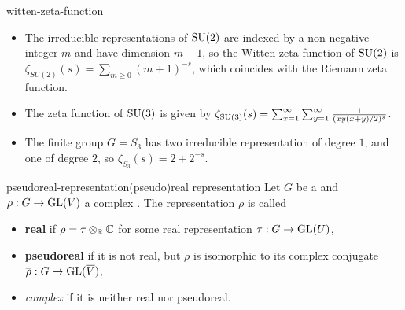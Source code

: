 \begin{example}{witten-zeta-function}
    \begin{itemize}
        \item The irreducible representations of $\textup{SU}(2)$ are indexed by a non-negative integer $m$ and have dimension $m + 1$, so the Witten zeta function of $\textup{SU}(2)$ is $\zeta_{SU(2)}(s) = \sum_{m \ge 0} (m + 1)^{-s}$, which coincides with the Riemann zeta function.
        \item The zeta function of $\textup{SU}(3)$ is given by $\zeta_{\textup{SU}(3)}(s) = \sum_{x = 1}^{\infty} \sum_{y = 1}^{\infty} \frac{1}{(xy(x + y) / 2)^s}$.
        \item The finite group $G = S_3$ has two irreducible representation of degree $1$, and one of degree $2$, so $\zeta_{S_3}(s) = 2 + 2^{-s}$.
    \end{itemize}
\end{example}

\begin{topic}{pseudoreal-representation}{(pseudo)real representation}
    Let $G$ be a  and $\rho : G \to \textup{GL}(V)$ a complex . The representation $\rho$ is called
    \begin{itemize}
        \item \textbf{real} if $\rho = \tau \otimes_{\mathbb{R}} \mathbb{C}$ for some real representation $\tau : G \to \textup{GL}(U)$,
        \item \textbf{pseudoreal} if it is not real, but $\rho$ is isomorphic to its complex conjugate $\overline{\rho} : G \to \textup{GL}(\overline{V})$,
        \item \textit{complex} if it is neither real nor pseudoreal.
    \end{itemize}
\end{topic}

